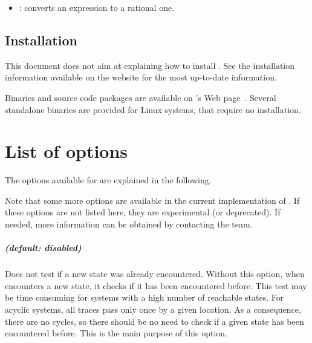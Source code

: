 \begin{itemize}
	\item {}: converts an  expression to a rational one.
\end{itemize}



\section{Installation}

This document does not aim at explaining how to install \imitator{}.
See the installation information available on the website for the most up-to-date information.

Binaries and source code packages are available on \imitator{}'s Web page~\cite{imitator}.
Several standalone binaries are provided for Linux systems, that require no installation.








\chapter{List of options}\label{chapter:options}

The options available for \imitator{} are explained in the following.

Note that some more options are available in the current implementation of \imitator{}.
If these options are not listed here, they are experimental (or deprecated).
If needed, more information can be obtained by contacting the \imitator{} team.



\paragraph{ (default: disabled)}
Does not test if a new state was already encountered.
Without this option, when \imitator{} encounters a new state, it checks if it has been encountered before.
This test may be time consuming for systems with a high number of reachable states.
For acyclic systems, all traces pass only once by a given location.
As a consequence, there are no cycles, so there should be no need to check if a given state has been encountered before.
This is the main purpose of this option.

